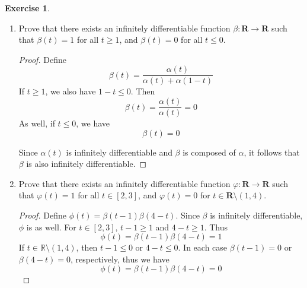 \documentclass{article}
\newcommand{\R}{\mathbf{R}}
\theoremstyle{plain} %
\numberwithin{thm}{section} %
\theoremstyle{definition}
\newtheorem{exercise}[thm]{Exercise} %
\begin{document}
\begin{exercise}
\begin{enumerate}[label=(\alph*)]
\begin{proof}
            \end{proof}
    
            \item Prove that there exists an infinitely differentiable function $\beta:\R\rightarrow \R$ such that $\beta(t)=1$ for all $t\geq 1$, and $\beta(t)=0$ for all $t\leq 0$.
    
            \begin{proof}
                Define
                \[
                    \beta (t) = \frac{\alpha (t)}{\alpha (t) + \alpha (1-t)}
                \] 
                If \(t\geq 1\), we also have \(1-t \leq 0\). Then
                \[
                    \beta (t) = \frac{\alpha (t)}{\alpha (t)} = 0
                \]
                As well, if \(t \leq 0\), we have
                \[
                    \beta (t) = 0
                \]

                Since \(\alpha(t)\) is infinitely differentiable and \(\beta\) is composed of \(\alpha \), it follows that \(\beta\) is also infinitely differentiable.

            \end{proof}
    
            \item Prove that there exists an infinitely differentiable function $\varphi:\R\rightarrow \R$ such that $\varphi(t)=1$ for all $t\in [2,3]$, and $\varphi(t)=0$ for $t\in \R\setminus (1,4)$.
    
            \begin{proof}
                Define \(\phi (t) = \beta (t-1) \beta (4-t)\).
                Since \(\beta\) is infinitely differentiable, \(\phi\) is as well. For \(t \in [2,3]\), \(t-1 \geq 1\) and \(4-t \geq 1\). Thus
                \[
                    \phi (t) = \beta(t-1) \beta (4-t) = 1
                \]
                If \(t \in \mathbb{R} \setminus (1,4)\), then \(t-1 \leq 0\) or \(4-t \leq 0\). In each case \(\beta(t-1) = 0\) or \(\beta (4-t) = 0\), respectively, thus we have
                \[
                    \phi (t) = \beta (t-1) \beta (4-t) = 0
                \]

            \end{proof}
        \end{enumerate}
    \end{exercise}
\end{document}
